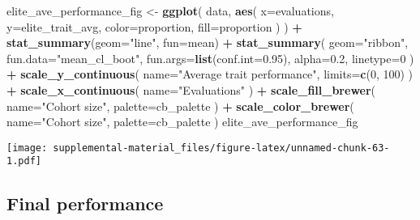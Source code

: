 \documentclass[]{book}
\newenvironment{Shaded}{\begin{snugshade}}{\end{snugshade}}
\newcommand{\DataTypeTok}[1]{\textcolor[rgb]{0.13,0.29,0.53}{#1}}
\newcommand{\DecValTok}[1]{\textcolor[rgb]{0.00,0.00,0.81}{#1}}
\newcommand{\FloatTok}[1]{\textcolor[rgb]{0.00,0.00,0.81}{#1}}
\newcommand{\KeywordTok}[1]{\textcolor[rgb]{0.13,0.29,0.53}{\textbf{#1}}}
\newcommand{\NormalTok}[1]{#1}
\newcommand{\OperatorTok}[1]{\textcolor[rgb]{0.81,0.36,0.00}{\textbf{#1}}}
\newcommand{\StringTok}[1]{\textcolor[rgb]{0.31,0.60,0.02}{#1}}
\begin{document}
\begin{Shaded}
\begin{Highlighting}[]
\NormalTok{elite_ave_performance_fig <-}
\StringTok{  }\KeywordTok{ggplot}\NormalTok{(}
\NormalTok{    data,}
    \KeywordTok{aes}\NormalTok{(}
      \DataTypeTok{x=}\NormalTok{evaluations,}
      \DataTypeTok{y=}\NormalTok{elite_trait_avg,}
      \DataTypeTok{color=}\NormalTok{proportion,}
      \DataTypeTok{fill=}\NormalTok{proportion}
\NormalTok{    )}
\NormalTok{  ) }\OperatorTok{+}
\StringTok{  }\KeywordTok{stat_summary}\NormalTok{(}\DataTypeTok{geom=}\StringTok{"line"}\NormalTok{, }\DataTypeTok{fun=}\NormalTok{mean) }\OperatorTok{+}
\StringTok{  }\KeywordTok{stat_summary}\NormalTok{(}
    \DataTypeTok{geom=}\StringTok{"ribbon"}\NormalTok{,}
    \DataTypeTok{fun.data=}\StringTok{"mean_cl_boot"}\NormalTok{,}
    \DataTypeTok{fun.args=}\KeywordTok{list}\NormalTok{(}\DataTypeTok{conf.int=}\FloatTok{0.95}\NormalTok{),}
    \DataTypeTok{alpha=}\FloatTok{0.2}\NormalTok{,}
    \DataTypeTok{linetype=}\DecValTok{0}
\NormalTok{  ) }\OperatorTok{+}
\StringTok{  }\KeywordTok{scale_y_continuous}\NormalTok{(}
    \DataTypeTok{name=}\StringTok{"Average trait performance"}\NormalTok{,}
    \DataTypeTok{limits=}\KeywordTok{c}\NormalTok{(}\DecValTok{0}\NormalTok{, }\DecValTok{100}\NormalTok{)}
\NormalTok{  ) }\OperatorTok{+}
\StringTok{  }\KeywordTok{scale_x_continuous}\NormalTok{(}
    \DataTypeTok{name=}\StringTok{"Evaluations"}
\NormalTok{  ) }\OperatorTok{+}
\StringTok{  }\KeywordTok{scale_fill_brewer}\NormalTok{(}
    \DataTypeTok{name=}\StringTok{"Cohort size"}\NormalTok{,}
    \DataTypeTok{palette=}\NormalTok{cb_palette}
\NormalTok{  ) }\OperatorTok{+}
\StringTok{  }\KeywordTok{scale_color_brewer}\NormalTok{(}
    \DataTypeTok{name=}\StringTok{"Cohort size"}\NormalTok{,}
    \DataTypeTok{palette=}\NormalTok{cb_palette}
\NormalTok{  )}
\NormalTok{elite_ave_performance_fig}
\end{Highlighting}
\end{Shaded}

\texttt{[image: supplemental-material\_files/figure-latex/unnamed-chunk-63-1.pdf]}

\hypertarget{final-performance-5}{%
\subsection{Final performance}\label{final-performance-5}}
\end{document}
